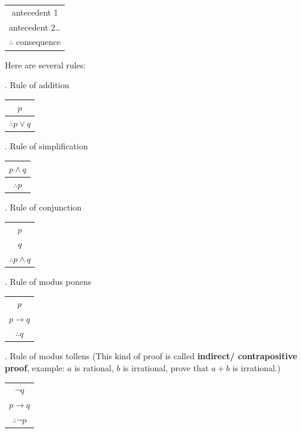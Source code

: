 \documentclass[12pt,a4paper]{report}
\theoremstyle{definition}
\theoremstyle{remark}
\begin{document}
\begin{center}
    \begin{tabular}{c}
        antecedent 1\\
        antecedent 2\dots\\
        \hline
        $\therefore$ consequence
    \end{tabular} 
\end{center}

Here are several rules:

. Rule of addition
\begin{center}
    \begin{tabular}{c}
        $p$\\
        \hline
        $\therefore p \lor q$
    \end{tabular} 
\end{center}

. Rule of simplification
\begin{center}
    \begin{tabular}{c}
        $p \land q$\\
        \hline
        $\therefore p$
    \end{tabular} 
\end{center}

. Rule of conjunction
\begin{center}
    \begin{tabular}{c}
        $p$\\
        $q$\\
        \hline
        $\therefore p \land q$
    \end{tabular} 
\end{center}

. Rule of modus ponens
\begin{center}
    \begin{tabular}{c}
        $p$\\
        $p \rightarrow q$\\
        \hline
        $\therefore q$
    \end{tabular} 
\end{center}

. Rule of modus tollens (This kind of proof is called \textbf{indirect/ contrapositive proof}, example: $a$ is rational, $b$ is irrational, prove that $a + b$ is irrational.)
\begin{center}
    \begin{tabular}{c}
        $\neg q$\\
        $p \rightarrow q$\\
        \hline
        $\therefore \neg p$
    \end{tabular} 
\end{center}
\end{document}
